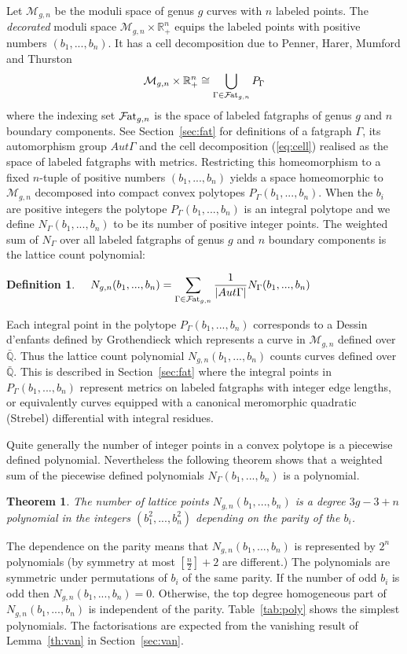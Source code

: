 \documentclass{amsart}
\newtheorem{theorem}{Theorem}
\newtheorem{defn}{Definition}
\newcommand{\bq}{\mathbb{Q}}
\newcommand{\br}{\mathbb{R}}
\newcommand{\modm}{\mathcal{M}}
\newcommand{\f}{\mathcal{F}}
\newcommand{\fat}{\f\hspace{-.3mm}{\rm at}_{g,n}}
\begin{document}
Let $\modm_{g,n}$ be the moduli space of genus $g$ curves with $n$ labeled points.  The {\em decorated} moduli space $\modm_{g,n}\times\br^n_+$ equips the labeled points with positive numbers $(b_1,...,b_n)$.   It has a cell decomposition due to Penner, Harer, Mumford and Thurston 
\begin{equation}  \label{eq:cell}
\modm_{g,n}\times\br^n_+\cong\bigcup_{\Gamma\in \fat}P_{\Gamma}
\end{equation}
where the indexing set $\fat$ is the space of labeled fatgraphs of genus $g$ and $n$ boundary components.  See Section~\ref{sec:fat} for definitions of a fatgraph $\Gamma$, its automorphism group $Aut \Gamma$ and the cell decomposition (\ref{eq:cell}) realised as the space of labeled fatgraphs with metrics.  Restricting this homeomorphism to a fixed $n$-tuple of positive numbers $(b_1,...,b_n)$ yields a space homeomorphic to $\modm_{g,n}$ decomposed into compact convex polytopes $P_{\Gamma}(b_1,...,b_n)$.  When the $b_i$ are positive integers the polytope $P_{\Gamma}(b_1,...,b_n)$ is an integral polytope and we define $N_{\Gamma}(b_1,...,b_n)$ to be its number of positive integer points.  The weighted sum of $N_{\Gamma}$ over all labeled fatgraphs of genus $g$ and $n$ boundary components is the lattice count polynomial:
\begin{defn}   \label{th:lcp}
$\quad \displaystyle N_{g,n}(b_1,...,b_n)=\sum_{\Gamma\in \fat}\frac{1}{|Aut \Gamma|}N_{\Gamma}(b_1,...,b_n)$
\end{defn}
Each integral point in the polytope $P_{\Gamma}(b_1,...,b_n)$ corresponds to a Dessin d'enfants defined by Grothendieck \cite{GroEsq} which represents a curve in $\modm_{g,n}$ defined over $\bar{\bq}$.  Thus the lattice count polynomial $N_{g,n}(b_1,...,b_n)$ counts curves defined over $\bar{\bq}$.  This is described in Section~\ref{sec:fat} where the integral points in $P_{\Gamma}(b_1,...,b_n)$ represent metrics on labeled fatgraphs with integer edge lengths, or equivalently curves equipped with a canonical meromorphic quadratic (Strebel) differential with integral residues.  

Quite generally the number of integer points in a convex polytope is a piecewise defined polynomial.  Nevertheless the following theorem shows that a weighted sum of the piecewise defined polynomials $N_{\Gamma}(b_1,...,b_n)$ is a polynomial.
\begin{theorem}   \label{th:poly}
The number of lattice points $N_{g,n}(b_1,...,b_n)$ is a degree $3g-3+n$ polynomial in the integers $(b_1^2,...,b_n^2)$ depending on the parity of the $b_i$.
\end{theorem}
The dependence on the parity means that $N_{g,n}(b_1,...,b_n)$ is represented by $2^n$ polynomials (by symmetry at most $[\frac{n}{2}]+2$ are different.)  The polynomials are symmetric under permutations of $b_i$ of the same parity.  If the number of odd $b_i$ is odd then $N_{g,n}(b_1,...,b_n)=0$.  Otherwise, the top degree homogeneous part of $N_{g,n}(b_1,...,b_n)$ is independent of the parity.  Table~\ref{tab:poly} shows the simplest polynomials.  The factorisations are expected from the vanishing result of Lemma~\ref{th:van} in Section~\ref{sec:van}.
\end{document}
